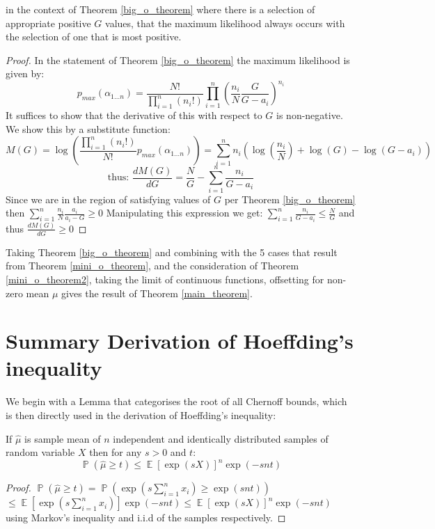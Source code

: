 \documentclass[12pt]{colt2020} %
\DeclareMathOperator{\E}{\mathbb{E}}
\DeclareMathOperator{\p}{\mathbb{P}}
\begin{document}
\begin{theorem}\label{mini_o_theorem2}
in the context of Theorem \ref{big_o_theorem} where there is a selection of appropriate positive $G$ values, that the maximum likelihood always occurs with the selection of one that is most positive.
\end{theorem}
\begin{proof}
In the statement of Theorem \ref{big_o_theorem} the maximum likelihood is given by:\\
$$p_{max}(\alpha_{1\dots n}) = \frac{N!}{\prod_{i=1}^n(n_i!)}\prod_{i=1}^n \left(\frac{n_i}{N}\frac{G}{G-a_i}\right)^{n_i}$$
It suffices to show that the derivative of this with respect to $G$ is non-negative. We show this by a substitute function:
$$M(G) = \log \left(\frac{\prod_{i=1}^n(n_i!)}{N!}p_{max}(\alpha_{1\dots n})\right) = \sum_{i=1}^n n_i\left(\log(\frac{n_i}{N})+\log(G)-\log(G-a_i)\right)$$
$$\mbox{thus: }\frac{dM(G)}{dG} = \frac{N}{G} - \sum_{i=1}^n\frac{n_i}{G-a_i}$$
Since we are in the region of satisfying values of $G$ per Theorem \ref{big_o_theorem} then $ \sum_{i=1}^n\frac{n_i}{N}\frac{a_i}{a_i-G}\ge 0 $
Manipulating this expression we get: $ \sum_{i=1}^n\frac{n_i}{G-a_i}\le \frac{N}{G} $ and thus
$\frac{dM(G)}{dG} \ge 0$
\end{proof}

Taking Theorem \ref{big_o_theorem} and combining with the 5 cases that result from Theorem \ref{mini_o_theorem}, and the consideration of Theorem \ref{mini_o_theorem2}, taking the limit of continuous functions, offsetting for non-zero mean $\mu$ gives the result of Theorem \ref{main_theorem}.
 
\section{Summary Derivation of Hoeffding's inequality}\label{appendix1}

We begin with a Lemma that categorises the root of all Chernoff bounds, which is then directly used in the derivation of Hoeffding's inequality:
\begin{lemma}\label{chernoff1}
If $\hat{\mu}$ is sample mean of $n$ independent and identically distributed samples of random variable $X$ then for any $s>0$ and $t$:
\[ \p(\hat{\mu}\ge t)\le\E\left[\exp(sX)\right]^n\exp(-snt) \]
\end{lemma}
\begin{proof}
$\p(\hat{\mu}\ge t) =  \p\left(\exp\left(s\sum_{i=1}^nx_i\right)\ge \exp(snt)\right)$\\
\-\hspace{10mm}$\le \E\left[\exp\left(s\sum_{i=1}^nx_i\right)\right]\exp(-snt) \le \E\left[\exp\left(sX\right)\right]^n\exp(-snt)
$\\
using Markov's inequality and i.i.d of the samples respectively.
\end{proof}
\end{document}
